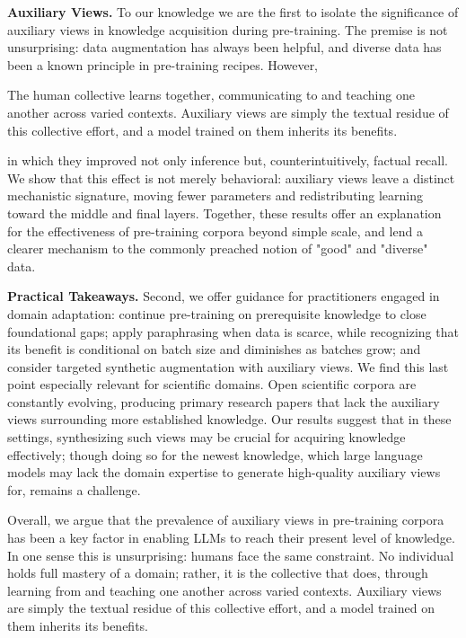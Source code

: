 \documentclass[11pt]{article}
\begin{document}
\textbf{Auxiliary Views.} To our knowledge we are the first to isolate the significance of auxiliary views in knowledge acquisition during pre-training. The premise is not unsurprising: data augmentation has always been helpful, and diverse data has been a known principle in pre-training recipes. However, 



The human collective learns together, communicating to and teaching one another across varied contexts. Auxiliary views are simply the textual residue of this collective effort, and a model trained on them inherits its benefits.

in which they improved not only inference but, counterintuitively, factual recall. We show that this effect is not merely behavioral: auxiliary views leave a distinct mechanistic signature, moving fewer parameters and redistributing learning toward the middle and final layers. Together, these results offer an explanation for the effectiveness of pre-training corpora beyond simple scale, and lend a clearer mechanism to the commonly preached notion of "good" and "diverse" data.

\textbf{Practical Takeaways.} Second, we offer guidance for practitioners engaged in domain adaptation: continue pre-training on prerequisite knowledge to close foundational gaps; apply paraphrasing when data is scarce, while recognizing that its benefit is conditional on batch size and diminishes as batches grow; and consider targeted synthetic augmentation with auxiliary views. We find this last point especially relevant for scientific domains. Open scientific corpora are constantly evolving, producing primary research papers that lack the auxiliary views surrounding more established knowledge. Our results suggest that in these settings, synthesizing such views may be crucial for acquiring knowledge effectively; though doing so for the newest knowledge, which large language models may lack the domain expertise to generate high-quality auxiliary views for, remains a challenge.

Overall, we argue that the prevalence of auxiliary views in pre-training corpora has been a key factor in enabling LLMs to reach their present level of knowledge. In one sense this is unsurprising: humans face the same constraint. No individual holds full mastery of a domain; rather, it is the collective that does, through learning from and teaching one another across varied contexts. Auxiliary views are simply the textual residue of this collective effort, and a model trained on them inherits its benefits.
\end{document}
